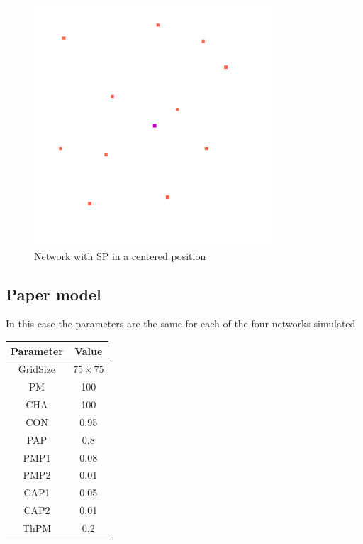 \begin{figure}
  \centering
    \includegraphics[width=0.8\textwidth]{central_sp_exp/1_central_sp}%
    
  \caption{Network with SP in a centered position}
  \label{fig:central_sp_exp/1_central_sp}
\end{figure}

\subsection{Paper model}

In this case the parameters are the same for each of the four networks simulated.

\begin{center}
 \begin{tabular}{||c c||} 
 \hline
 Parameter & Value \\ [0.5ex] 
 \hline\hline
 GridSize & $75 \times 75$ \\ 
 \hline
 PM & 100 \\ 
 \hline
 CHA & 100 \\ 
 \hline
 CON & 0.95 \\ 
 \hline
 PAP & 0.8 \\ 
 \hline
 PMP1 & 0.08 \\ 
 \hline
 PMP2 & 0.01 \\ 
 \hline
 CAP1 & 0.05 \\ 
 \hline
 CAP2 & 0.01 \\ 
 \hline
 ThPM & 0.2 \\ [1ex] 
 \hline
 \end{tabular}
\end{center}

